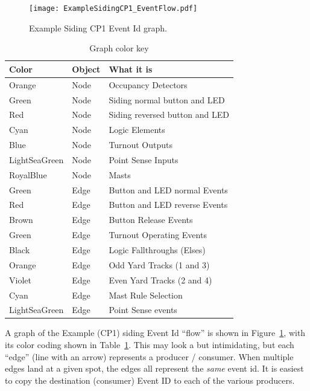 \begin{figure}[hbpt]\begin{centering}%
\texttt{[image: ExampleSidingCP1\_EventFlow.pdf]}
\caption{Example Siding CP1  Event Id graph.}
\label{fig:ExampleSidingCP1EventFlow}
\end{centering}\end{figure}
\begin{table}[hbpt]\begin{centering}%
\begin{tabular}{|l|l|p{2in}|}
\hline
Color&Object&What it is\\
\hline
Orange&Node&Occupancy Detectors\\
\hline
Green&Node&Siding normal button and LED\\
\hline
Red&Node&Siding reversed button and LED\\
\hline
Cyan&Node&Logic Elements\\
\hline
Blue&Node&Turnout Outputs\\
\hline
LightSeaGreen&Node&Point Sense Inputs\\
\hline
RoyalBlue&Node&Masts\\
\hline 
Green&Edge&Button and LED normal Events\\
\hline
Red&Edge&Button and LED reverse Events\\
\hline
Brown&Edge&Button Release Events\\
\hline
Green&Edge&Turnout Operating Events\\
\hline
Black&Edge&Logic Fallthroughs (Elses)\\
\hline
Orange&Edge&Odd Yard Tracks (1 and 3)\\
\hline
Violet&Edge&Even Yard Tracks (2 and 4)\\
\hline
Cyan&Edge&Mast Rule Selection\\
\hline
LightSeaGreen&Edge&Point Sense events\\
\hline
\end{tabular}
\caption{Graph color key}
\label{tab:ExampleSidingCP1EventFlow}
\end{centering}\end{table}

A graph of the Example (CP1) siding Event Id ``flow'' is shown in 
Figure~\ref{fig:ExampleSidingCP1EventFlow}, with its color coding shown in 
Table~\ref{tab:ExampleSidingCP1EventFlow}. This may look a but intimidating, 
but each ``edge'' (line with an arrow) represents a producer / consumer. When 
multiple edges land at a given spot, the edges all represent the \textit{same} 
event id. It is easiest to copy the destination (consumer) Event ID to each of 
the various producers.


\clearpage
